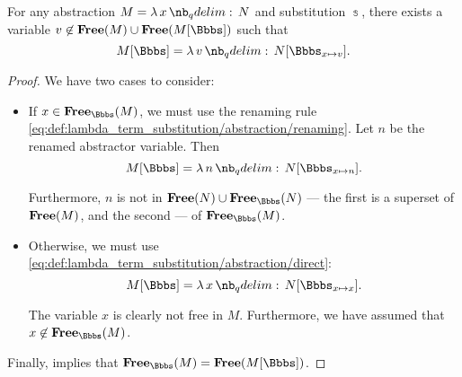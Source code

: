 \begin{proposition}\label{thm:lambda_substitution_single_rule}
  For any abstraction \( M = \qabs x N \) and substitution \( \Bbbs \), there exists a variable \( v \not\in \op*{Free}(M) \cup \op*{Free}(M[\Bbbs]) \) such that
  \begin{equation}\label{eq:thm:lambda_substitution_single_rule}
    M[\Bbbs] = \qabs v N[\Bbbs_{x \mapsto v}].
  \end{equation}
\end{proposition}
\begin{proof}
  We have two cases to consider:
  \begin{itemize}
    \item If \( x \in \op*{Free}_\Bbbs(M) \), we must use the renaming rule \eqref{eq:def:lambda_term_substitution/abstraction/renaming}. Let \( n \) be the renamed abstractor variable. Then
    \begin{equation*}
      M[\Bbbs] = \qabs n N[\Bbbs_{x \mapsto n}].
    \end{equation*}

    Furthermore, \( n \) is not in \( \op*{Free}(N) \cup \op*{Free}_\Bbbs(N) \) --- the first is a superset of \( \op*{Free}(M) \), and the second --- of \( \op*{Free}_\Bbbs(M) \).

    \item Otherwise, we must use \eqref{eq:def:lambda_term_substitution/abstraction/direct}:
    \begin{equation*}
      M[\Bbbs] = \qabs x N[\Bbbs_{x \mapsto x}].
    \end{equation*}

    The variable \( x \) is clearly not free in \( M \). Furthermore, we have assumed that \( x \not\in \op*{Free}_\Bbbs(M) \).
  \end{itemize}

  Finally,  implies that \( \op*{Free}_\Bbbs(M) = \op*{Free}(M[\Bbbs]) \).
\end{proof}
